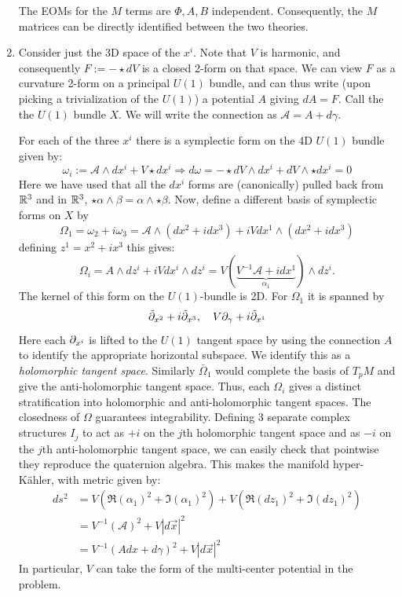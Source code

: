 \documentclass[11pt, class=article, crop=false]{standalone}
\begin{document}
\begin{enumerate}
	The EOMs for the $M$ terms are $\Phi, A, B$ independent. Consequently, the $M$ matrices can be directly identified between the two theories.
	
	\item Consider just the 3D space of the $x^i$. Note that $V$ is harmonic, and consequently $F := - \star d V$ is a closed 2-form on that space. We can view $F$ as a curvature 2-form on a principal $U(1)$ bundle, and can thus write (upon picking a trivialization of the $U(1)$) a potential $A$ giving $d A = F$. Call the the $U(1)$ bundle $X$. We will write the connection as $\mathcal A = A + d \gamma$.
	
	For each of the three $x^i$ there is a symplectic form on the 4D $U(1)$ bundle given by: 
	\[
		\omega_i := \mathcal A \wedge dx^i + V \star dx^i \Rightarrow d \omega = - \star dV \wedge dx^i + dV \wedge \star dx^i = 0
	\]
	Here we have used that all the $dx^i$ forms are (canonically) pulled back from $\mathbb{R}^3$ and in $\mathbb{R}^3$, $\star \alpha \wedge \beta = \alpha \wedge \star \beta$. Now, define a different basis of symplectic forms on $X$ by
	\[
		\Omega_1 = \omega_2 + i \omega_3 = \mathcal A \wedge (dx^2 + i dx^3) + i V dx^1 \wedge (dx^2 + i dx^3) 
	\]
	defining $z^1 = x^2 + i x^3$ this gives:
	\[
		\Omega_i = A \wedge dz^i + i V dx^i \wedge dz^i = V (\underbrace{V^{-1} \mathcal A + i dx^1}_{\alpha_1}) \wedge dz^i.
	\]
	The kernel of this form on the $U(1)$-bundle is 2D. For $\Omega_1$ it is spanned by 
	\[
		\tilde {\partial}_{x^2} + i \tilde {\partial}_{x^3}, \quad V \partial_\gamma + i \tilde {\partial}_{x^1}
	\]
	Here each $\partial_{x^i}$ is lifted to the $U(1)$ tangent space by using the connection $A$ to identify the appropriate horizontal subspace. We identify this as a \emph{holomorphic tangent space}. Similarly $\bar \Omega_1$ would complete the basis of $T_p M$ and give the anti-holomorphic tangent space. Thus, each $\Omega_i$ gives a distinct stratification into holomorphic and anti-holomorphic tangent spaces. The closedness of $\Omega$ guarantees integrability. Defining 3 separate complex structures $I_j$ to act as $+i$ on the $j$th holomorphic tangent space and as $-i$ on the $j$th anti-holomorphic tangent space, we can easily check that pointwise they reproduce the quaternion algebra. This makes the manifold hyper-K\"ahler, with metric given by:
	\[
	\begin{aligned}
		ds^2 &= V (\Re(\alpha_1)^2 + \Im(\alpha_1)^2) + V (\Re(dz_1)^2 + \Im(dz_1)^2) \\
		&= V^{-1} (\mathcal A)^2 + V |d\vec x|^2 \\
		&=  V^{-1} (A dx + d \gamma)^2 + V |d\vec x|^2 
	\end{aligned}
	\]
	In particular, $V$ can take the form of the multi-center potential in the problem.


\end{enumerate}
\end{document}
